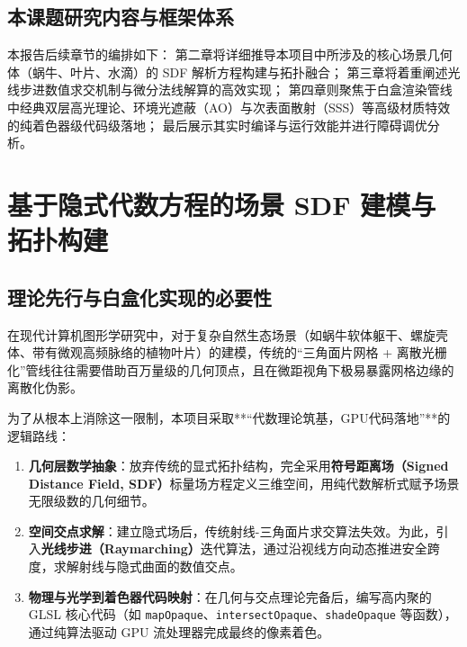 \documentclass[11pt, a4paper, oneside]{report}
\newcommand{\keyword}[1]{\textbf{#1}}
\newcommand{\code}[1]{\texttt{#1}}
\begin{document}
\section{本课题研究内容与框架体系}
本报告后续章节的编排如下：
第二章将详细推导本项目中所涉及的核心场景几何体（蜗牛、叶片、水滴）的 SDF 解析方程构建与拓扑融合；
第三章将着重阐述光线步进数值求交机制与微分法线解算的高效实现；
第四章则聚焦于白盒渲染管线中经典双层高光理论、环境光遮蔽（AO）与次表面散射（SSS）等高级材质特效的纯着色器级代码级落地；
最后展示其实时编译与运行效能并进行障碍调优分析。

\chapter{基于隐式代数方程的场景 SDF 建模与拓扑构建}

\section{理论先行与白盒化实现的必要性}
在现代计算机图形学研究中，对于复杂自然生态场景（如蜗牛软体躯干、螺旋壳体、带有微观高频脉络的植物叶片）的建模，传统的“三角面片网格 + 离散光栅化”管线往往需要借助百万量级的几何顶点，且在微距视角下极易暴露网格边缘的离散化伪影。

为了从根本上消除这一限制，本项目采取**“代数理论筑基，GPU代码落地”**的逻辑路线：
\begin{enumerate}
    \item \keyword{几何层数学抽象}：放弃传统的显式拓扑结构，完全采用\keyword{符号距离场（Signed Distance Field, SDF）}标量场方程定义三维空间，用纯代数解析式赋予场景无限级数的几何细节。
    \item \keyword{空间交点求解}：建立隐式场后，传统射线-三角面片求交算法失效。为此，引入\keyword{光线步进（Raymarching）}迭代算法，通过沿视线方向动态推进安全跨度，求解射线与隐式曲面的数值交点。
    \item \keyword{物理与光学到着色器代码映射}：在几何与交点理论完备后，编写高内聚的 GLSL 核心代码（如 \code{mapOpaque}、\code{intersectOpaque}、\code{shadeOpaque} 等函数），通过纯算法驱动 GPU 流处理器完成最终的像素着色。
\end{enumerate}
\end{document}
